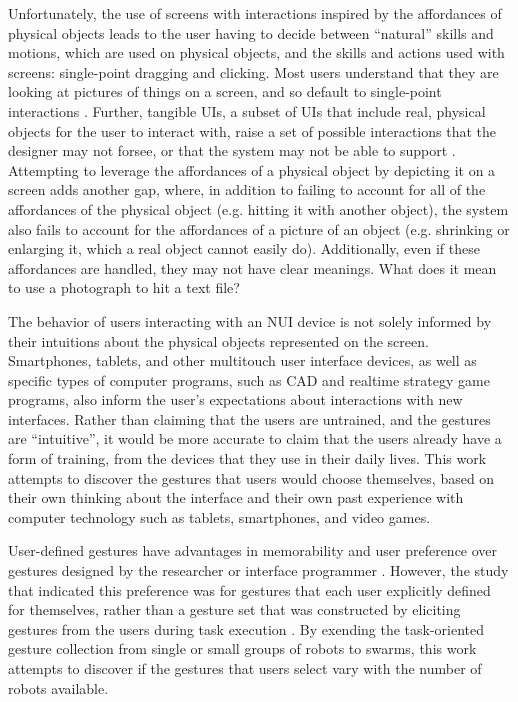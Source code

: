 Unfortunately, the use of screens with interactions inspired by the affordances of physical objects leads to the user having to decide between ``natural'' skills and motions, which are used on physical objects, and the skills and actions used with screens: single-point dragging and clicking. 
Most users understand that they are looking at pictures of things on a screen, and so default to single-point interactions \citep{vanacken2008ghosts}.
Further, tangible UIs, a subset of UIs that include real, physical objects for the user to interact with, raise a set of possible interactions that the designer may not forsee, or that the system may not be able to support \citep{hornecker2012beyond}.
Attempting to leverage the affordances of a physical object by depicting it on a screen adds another gap, where, in addition to failing to account for all of the affordances of the physical object (e.g. hitting it with another object), the system also fails to account for the affordances of a picture of an object (e.g. shrinking or enlarging it, which a real object cannot easily do). 
Additionally, even if these affordances are handled, they may not have clear meanings. 
What does it mean to use a photograph to hit a text file?

The behavior of users interacting with an NUI device is not solely informed by their intuitions about the physical objects represented on the screen. 
Smartphones, tablets, and other multitouch user interface devices, as well as specific types of computer programs, such as CAD and realtime strategy game programs, also inform the user's expectations about interactions with new interfaces. 
Rather than claiming that the users are untrained, and the gestures are ``intuitive'', it would be more accurate to claim that the users already have a form of training, from the devices that they use in their daily lives. 
This work attempts to discover the gestures that users would choose themselves, based on their own thinking about the interface and their own past experience with computer technology such as tablets, smartphones, and video games. 

User-defined gestures have advantages in memorability and user preference over gestures designed by the researcher or interface programmer \citep{nacenta2013memorability}. 
However, the study that indicated this preference was for gestures that each user explicitly defined for themselves, rather than a gesture set that was constructed by eliciting gestures from the users during task execution \citep{Micire:2009:ANG:1731903.1731912}. 
By exending the task-oriented gesture collection from single or small groups of robots to swarms, this work attempts to discover if the gestures that users select vary with the number of robots available.

